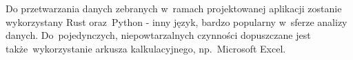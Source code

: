 \documentclass[11pt,a4paper,oneside]{report}
\begin{document}
Do przetwarzania danych zebranych w~ramach projektowanej aplikacji zostanie wykorzystany Rust oraz~Python - inny język, bardzo popularny w~sferze analizy danych. Do~pojedynczych, niepowtarzalnych czynności dopuszczane jest także~wykorzystanie arkusza kalkulacyjnego, np.~Microsoft Excel.

\PlaceholderNote
{}
\PlaceholderNote
{}
\PlaceholderNote
{}
\PlaceholderNote
{}
\PlaceholderNote








\end{document}
